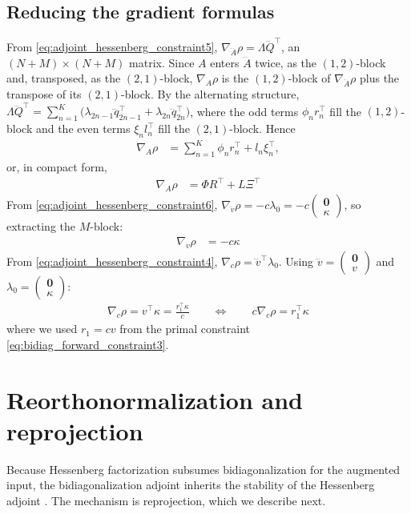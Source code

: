 \documentclass[a4paper,12pt]{article}
\theoremstyle{definition}
\begin{document}
\subsection{Reducing the gradient formulas}
From \eqref{eq:adjoint_hessenberg_constraint5}, $\nabla_{\dddot{A}}\rho = \Lambda \dddot{Q}^\top$, an $(N{+}M) \times (N{+}M)$ matrix. Since $A$ enters $\dddot{A}$ twice, as the $(1,2)$-block and, transposed, as the $(2,1)$-block, $\nabla_A\rho$ is the $(1,2)$-block of $\nabla_{\dddot{A}}\rho$ plus the transpose of its $(2,1)$-block. By the alternating structure, $\Lambda \dddot{Q}^\top = \sum_{n=1}^K \big(\lambda_{2n-1} \dddot{q}_{2n-1}^\top + \lambda_{2n} \dddot{q}_{2n}^\top\big)$, where the odd terms $\phi_n r_n^\top$ fill the $(1,2)$-block and the even terms $\xi_n l_n^\top$ fill the $(2,1)$-block. Hence
\begin{align*}
    \nabla_A\rho &= \sum_{n=1}^K \phi_n r_n^\top + l_n \xi_n^\top,
\end{align*}
or, in compact form,
\begin{align}
    \nabla_A\rho &= \Phi R^\top + L\Xi^\top \label{eq:stable_grad_A}
\end{align}
From \eqref{eq:adjoint_hessenberg_constraint6}, $\nabla_{\dddot{v}}\rho = -c\lambda_0 = -c\begin{pmatrix}\mathbf{0} \\ \kappa\end{pmatrix}$, so extracting the $M$-block:
\begin{align}
    \nabla_v\rho &= -c\kappa \label{eq:stable_grad_v}
\end{align}
From \eqref{eq:adjoint_hessenberg_constraint4}, $\nabla_c\rho = \dddot{v}^\top\lambda_0$. Using $\dddot{v} = \begin{pmatrix}\mathbf{0} \\ v\end{pmatrix}$ and $\lambda_0 = \begin{pmatrix}\mathbf{0} \\ \kappa\end{pmatrix}$:
\begin{align}
    \nabla_c\rho = v^\top \kappa = \frac{r_1^\top \kappa}{c} \qquad \iff \qquad c\nabla_c\rho = r_1^\top \kappa \label{eq:stable_grad_c}
\end{align}
where we used $r_1 = cv$ from the primal constraint \eqref{eq:bidiag_forward_constraint3}.

\section{Reorthonormalization and reprojection}\label{app:reprojection}
Because Hessenberg factorization subsumes bidiagonalization for the augmented input, the bidiagonalization adjoint inherits the stability of the Hessenberg adjoint \citep{kraemer2024gradients}. The mechanism is reprojection, which we describe next.
\end{document}
